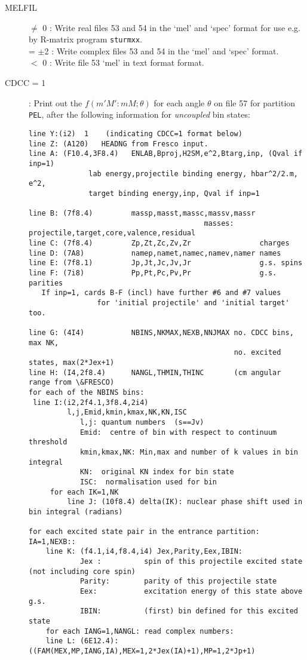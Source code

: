 \documentclass[11pt]{article}
\begin{document}
\begin{description}
\item[MELFIL]
  $\ne$ 0 : Write real files 53 and 54 in the `mel' and `spec' format
        for use e.g. by R-matrix program {\tt sturmxx}.
\\  = $\pm$2 : Write complex files 53 and 54 in the `mel' and `spec' format.
\\   $<$ 0 : Write file 53 `mel' in text format format.

\item[CDCC = 1]:
Print out the $f(m'M':mM; \theta)$ for each angle $\theta$
on file 57 for partition {\tt PEL}, after the following information for {\em uncoupled} bin states:
{\footnotesize
\begin{verbatim}
line Y:(i2)  1    (indicating CDCC=1 format below)
line Z: (A120)   HEADNG from Fresco input.
line A: (F10.4,3F8.4)   ENLAB,Bproj,H2SM,e^2,Btarg,inp, (Qval if inp=1)
              lab energy,projectile binding energy, hbar^2/2.m, e^2, 
              target binding energy,inp, Qval if inp=1
                                                
line B: (7f8.4)         massp,masst,massc,massv,massr  
                                         masses: projectile,target,core,valence,residual
line C: (7f8.4)         Zp,Zt,Zc,Zv,Zr                charges
line D: (7A8)           namep,namet,namec,namev,namer names
line E: (7f8.1)         Jp,Jt,Jc,Jv,Jr                g.s. spins
line F: (7i8)           Pp,Pt,Pc,Pv,Pr                g.s. parities
   If inp=1, cards B-F (incl) have further #6 and #7 values 
                for 'initial projectile' and 'initial target' too.
   
line G: (4I4)           NBINS,NKMAX,NEXB,NNJMAX no. CDCC bins, max NK,
                                                no. excited states, max(2*Jex+1)
line H: (I4,2f8.4)      NANGL,THMIN,THINC       (cm angular range from \&FRESCO)
for each of the NBINS bins:
 line I:(i2,2f4.1,3f8.4,2i4)
         l,j,Emid,kmin,kmax,NK,KN,ISC
            l,j: quantum numbers  (s==Jv)
            Emid:  centre of bin with respect to continuum threshold
            kmin,kmax,NK: Min,max and number of k values in bin integral
            KN:  original KN index for bin state
            ISC:  normalisation used for bin
     for each IK=1,NK
         line J: (10f8.4) delta(IK): nuclear phase shift used in bin integral (radians)

for each excited state pair in the entrance partition: IA=1,NEXB::
    line K: (f4.1,i4,f8.4,i4) Jex,Parity,Eex,IBIN:
            Jex :          spin of this projectile excited state  (not including core spin)
            Parity:        parity of this projectile state
            Eex:           excitation energy of this state above g.s.
            IBIN:          (first) bin defined for this excited state
    for each IANG=1,NANGL: read complex numbers:
    line L: (6E12.4): ((FAM(MEX,MP,IANG,IA),MEX=1,2*Jex(IA)+1),MP=1,2*Jp+1)
\end{verbatim}
}


\end{description}
\end{document}
